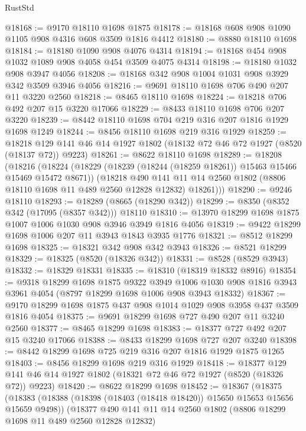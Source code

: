 \begin{lexlean}{RustStd}
\begin{coremodule}
@18168 := @9170 @18110 @1698 @1875
@18178 := @18168 @608 @908 @1090 @1105 @908 @4316 @608 @3509 @1816 @4412
@18180 := @8880 @18110 @1698
@18184 := @18180 @1090 @908 @4076 @4314
@18194 := @18168 @454 @908 @1032 @1089 @908 @4058 @454 @3509 @4075 @4314
@18198 := @18180 @1032 @908 @3947 @4056
@18208 := @18168 @342 @908 @1004 @1031 @908 @3929 @342 @3509 @3946 @4056
@18216 := @9691 @18110 @1698 @706 @490 @207 @11 @3220 @2560
@18218 := @8465 @18110 @1698
@18224 := @18218 @706 @492 @207 @15 @3220 @17066
@18229 := @8433 @18110 @1698 @706 @207 @3220
@18239 := @8442 @18110 @1698 @704 @219 @316 @207 @1816 @1929 @1698 @1249
@18244 := @8456 @18110 @1698 @219 @316 @1929
@18259 := @18218 @129 @141 @46 @14 @1927 @1802 (@18132 @72 @46 @72 @1927 (@8520 (@18137 @72)) @9223)
@18261 := @8622 @18110 @1698
@18289 := @18208
    (@18216
      (@18224
        (@18229 (@18239 (@18244 (@18259 @18261)) @15463 @15466 @15469 @15472 @8671))
        (@18218
          @490
          @141
          @11
          @14
          @2560
          @1802
          (@8806 @18110 @1698 @11 @489 @2560 @12828 @12832)
          @18261)))
@18290 := @9246 @18110
@18293 := @18289 (@8665 (@18290 @342))
@18299 := @8350 (@8352 @342 (@17095 (@8357 @342))) @18110
@18310 := @13970 @18299 @1698 @1875 @1007 @1006 @1030 @908 @3946 @3949 @1816 @4056
@18319 := @9422 @18299 @1698 @1006 @207 @11 @3943 @1843 @3935 @1776
@18321 := @8512 @18299 @1698
@18325 := @18321 @342 @908 @342 @3943
@18326 := @8521 @18299
@18329 := @18325 (@8520 (@18326 @342))
@18331 := @8528 (@8529 @3943)
@18332 := @18329 @18331
@18335 := @18310 (@18319 @18332 @8916)
@18354 := @9318
    @18299
    @1698
    @1875
    @9322
    @3949
    @1006
    @1030
    @908
    @1816
    @3943
    @3961
    @4054
    (@8797 @18299 @1698 @1006 @908 @3943 @18332)
@18367 := @9170 @18299 @1698 @1875 @437 @908 @1014 @1029 @908 @3958 @437 @3509 @1816 @4054
@18375 := @9691 @18299 @1698 @727 @490 @207 @11 @3240 @2560
@18377 := @8465 @18299 @1698
@18383 := @18377 @727 @492 @207 @15 @3240 @17066
@18388 := @8433 @18299 @1698 @727 @207 @3240
@18398 := @8442 @18299 @1698 @725 @219 @316 @207 @1816 @1929 @1875 @1265
@18403 := @8456 @18299 @1698 @219 @316 @1929
@18418 := @18377 @129 @141 @46 @14 @1927 @1802 (@18321 @72 @46 @72 @1927 (@8520 (@18326 @72)) @9223)
@18420 := @8622 @18299 @1698
@18452 := @18367
    (@18375
      (@18383
        (@18388 (@18398 (@18403 (@18418 @18420)) @15650 @15653 @15656 @15659 @9498))
        (@18377
          @490
          @141
          @11
          @14
          @2560
          @1802
          (@8806 @18299 @1698 @11 @489 @2560 @12828 @12832)

\end{coremodule}
\end{lexlean}

